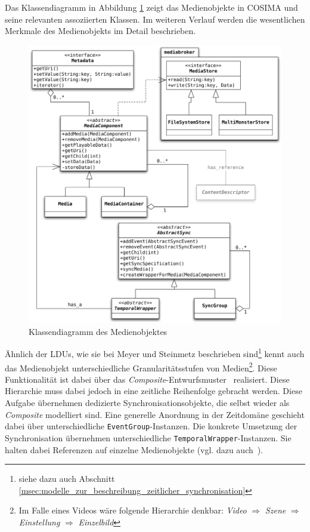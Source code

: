   Das Klassendiagramm in Abbildung \ref{fig:medienobjekt} zeigt das Medienobjekte in COSIMA und seine relevanten assoziierten Klassen. Im weiteren Verlauf werden die wesentlichen Merkmale des Medienobjekts im Detail beschrieben.
  
  \begin{figure}[!ht]
    \centering
      \includegraphics[width=.9\textwidth]{images/Medienobjekt.pdf}
    \caption{Klassendiagramm des Medienobjektes}
    \label{fig:medienobjekt}
  \end{figure}

\label{msec:eigenschaften_des_medienobjektes}

  Ähnlich der LDUs, wie sie bei Meyer und Steinmetz beschrieben sind\footnote{siehe dazu auch Abschnitt \ref{msec:modelle_zur_beschreibung_zeitlicher_synchronisation}} kennt auch das Medienobjekt unterschiedliche Granularitätsstufen von Medien\footnote{Im Falle eines Videos wäre folgende Hierarchie denkbar: \emph{Video} $\Rightarrow$ \emph{Szene} $\Rightarrow$ \emph{Einstellung} $\Rightarrow$ \emph{Einzelbild}}. Diese Funktionalität ist dabei über das \emph{Composite}-Entwurfsmuster~\citep[S. 163]{design_patterns} realisiert.  Diese Hierarchie muss dabei jedoch in eine zeitliche Reihenfolge gebracht werden. Diese Aufgabe übernehmen dedizierte Synchronisationsobjekte, die selbst wieder als \emph{Composite} modelliert sind. Eine generelle Anordnung in der Zeitdomäne geschieht dabei über unterschiedliche \verb!EventGroup!-Instanzen. Die konkrete Umsetzung der Synchronisation übernehmen unterschiedliche \verb!TemporalWrapper!-Instanzen. Sie halten dabei Referenzen auf einzelne Medienobjekte (vgl. dazu auch~\citep[S. 84]{ackermann1996doo}).
  
